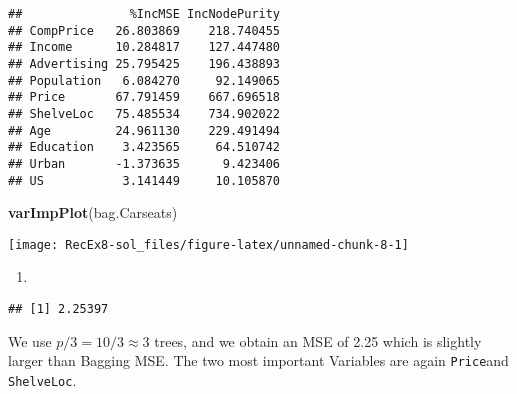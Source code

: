 \documentclass[]{article}
\newenvironment{Shaded}{\begin{snugshade}}{\end{snugshade}}
\newcommand{\DataTypeTok}[1]{\textcolor[rgb]{0.13,0.29,0.53}{#1}}
\newcommand{\DecValTok}[1]{\textcolor[rgb]{0.00,0.00,0.81}{#1}}
\newcommand{\KeywordTok}[1]{\textcolor[rgb]{0.13,0.29,0.53}{\textbf{#1}}}
\newcommand{\NormalTok}[1]{#1}
\newcommand{\OperatorTok}[1]{\textcolor[rgb]{0.81,0.36,0.00}{\textbf{#1}}}
\newcommand{\OtherTok}[1]{\textcolor[rgb]{0.56,0.35,0.01}{#1}}
\newcommand{\StringTok}[1]{\textcolor[rgb]{0.31,0.60,0.02}{#1}}
\begin{document}
\begin{verbatim}
##               %IncMSE IncNodePurity
## CompPrice   26.803869    218.740455
## Income      10.284817    127.447480
## Advertising 25.795425    196.438893
## Population   6.084270     92.149065
## Price       67.791459    667.696518
## ShelveLoc   75.485534    734.902022
## Age         24.961130    229.491494
## Education    3.423565     64.510742
## Urban       -1.373635      9.423406
## US           3.141449     10.105870
\end{verbatim}

\begin{Shaded}
\begin{Highlighting}[]
\KeywordTok{varImpPlot}\NormalTok{(bag.Carseats)}
\end{Highlighting}
\end{Shaded}

\texttt{[image: RecEx8-sol\_files/figure-latex/unnamed-chunk-8-1]}

\begin{enumerate}
\def\labelenumi{\alph{enumi})}
\setcounter{enumi}{4}
\item
\end{enumerate}

\begin{Shaded}
\end{Shaded}

\begin{verbatim}
## [1] 2.25397
\end{verbatim}

We use \(p/3 = 10/3 \approx 3\) trees, and we obtain an MSE of 2.25
which is slightly larger than Bagging MSE. The two most important
Variables are again \texttt{Price}and \texttt{ShelveLoc}.
\end{document}
